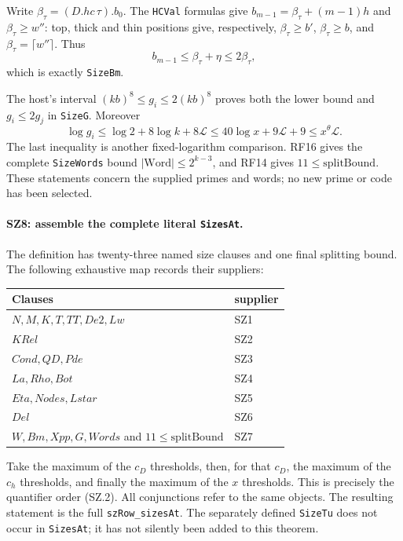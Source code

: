 Write $\beta_\tau=(D.hc\,\tau).b_0$. The \texttt{HCVal}
formulas give $b_{m-1}=\beta_\tau+(m-1)h$ and
$\beta_\tau\geq w''$: top, thick and thin positions give,
respectively, $\beta_\tau\geq b'$, $\beta_\tau\geq b$, and
$\beta_\tau=\lceil w''\rceil$. Thus
\[
       b_{m-1}\leq\beta_\tau+\eta\leq2\beta_\tau,
\]
which is exactly \texttt{SizeBm}.

The host's interval $(kb)^8\leq g_i\leq2(kb)^8$ proves both
the lower bound and $g_i\leq2g_j$ in \texttt{SizeG}. Moreover
\[
 \log g_i\leq\log2+8\log k+8\mathcal L
          \leq40\log x+9\mathcal L+9
          \leq x^\theta\mathcal L.
\]
The last inequality is another fixed-logarithm comparison. RF16 gives
the complete \texttt{SizeWords} bound
$|\mathrm{Word}|\leq2^{k-3}$, and RF14 gives
$11\leq\mathrm{splitBound}$. These statements concern the supplied
primes and words; no new prime or code has been selected.

\paragraph{SZ8: assemble the complete literal \texttt{SizesAt}.}
The definition has twenty-three named size clauses and one final
splitting bound. The following exhaustive map records their suppliers:
\begin{center}\small
\begin{tabular}{p{}l}
Clauses & supplier\\\hline
$N,M,K,T,TT,De2,Lw$ & SZ1\\
$KRel$ & SZ2\\
$Cond,QD,Pde$ & SZ3\\
$La,Rho,Bot$ & SZ4\\
$Eta,Nodes,Lstar$ & SZ5\\
$Del$ & SZ6\\
$W,Bm,Xpp,G,Words$ and $11\leq\mathrm{splitBound}$ & SZ7
\end{tabular}
\end{center}
Take the maximum of the $c_D$ thresholds, then, for that $c_D$,
the maximum of the $c_h$ thresholds, and finally the maximum of the
$x$ thresholds. This is precisely the quantifier order (SZ.2).
All conjunctions refer to the same objects. The resulting statement is
the full \texttt{szRow\_sizesAt}. The separately defined
\texttt{SizeTu} does not occur in \texttt{SizesAt}; it has not
silently been added to this theorem.

